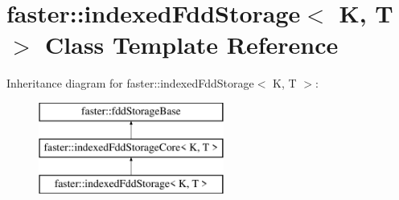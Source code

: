 \hypertarget{classfaster_1_1indexedFddStorage}{}\section{faster\+:\+:indexed\+Fdd\+Storage$<$ K, T $>$ Class Template Reference}
\label{classfaster_1_1indexedFddStorage}
Inheritance diagram for faster\+:\+:indexed\+Fdd\+Storage$<$ K, T $>$\+:\begin{figure}[H]
\begin{center}
\leavevmode
\includegraphics[height=3.000000cm]{classfaster_1_1indexedFddStorage}
\end{center}
\end{figure}
